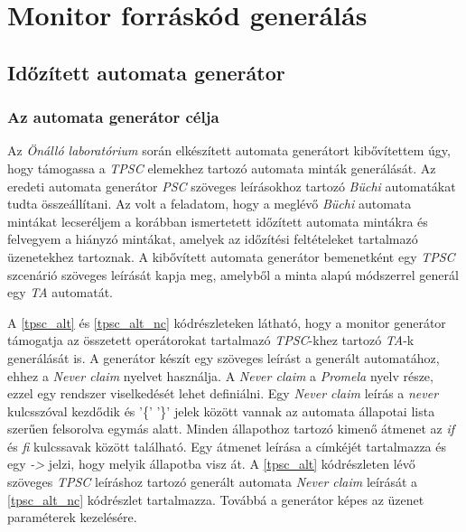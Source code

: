 \chapter{Monitor forráskód generálás}\section{Időzített automata generátor}

\subsection{Az automata generátor célja}

Az \textit{Önálló laboratórium} során elkészített automata generátort kibővítettem úgy, hogy támogassa a \textit{TPSC} elemekhez tartozó automata minták generálását.
Az eredeti automata generátor \textit{PSC} szöveges leírásokhoz tartozó \textit{Büchi} automatákat tudta összeállítani.
Az volt a feladatom, hogy a meglévő \textit{Büchi} automata mintákat lecseréljem a korábban ismertetett időzített automata mintákra és felvegyem a hiányzó mintákat, amelyek az időzítési feltételeket tartalmazó üzenetekhez tartoznak.
A kibővített automata generátor bemenetként egy \textit{TPSC} szcenárió szöveges leírását kapja meg, amelyből a minta alapú módszerrel generál egy \textit{TA} automatát.

A \ref{tpsc_alt} és \ref{tpsc_alt_nc} kódrészleteken látható, hogy a monitor generátor támogatja az összetett operátorokat tartalmazó \textit{TPSC}-khez tartozó \textit{TA}-k generálását is.
A generátor készít egy szöveges leírást a generált automatához, ehhez a \textit{Never claim} nyelvet használja.
A \textit{Never claim} \cite{NeverClaim} a \textit{Promela} nyelv része, ezzel egy rendszer viselkedését lehet definiálni.
Egy \textit{Never claim} leírás a \textit{never} kulcsszóval kezdődik és '\{' '\}' jelek között vannak az automata állapotai lista szerűen felsorolva egymás alatt.
Minden állapothoz tartozó kimenő átmenet az \textit{if} és \textit{fi} kulcssavak között található.
Egy átmenet leírása a címkéjét tartalmazza és egy \textit{->} jelzi, hogy melyik állapotba visz át.
A \ref{tpsc_alt} kódrészleten lévő szöveges \textit{TPSC} leíráshoz tartozó generált automata \textit{Never claim} leírását a \ref{tpsc_alt_nc} kódrészlet tartalmazza.
Továbbá a generátor képes az üzenet paraméterek kezelésére.

